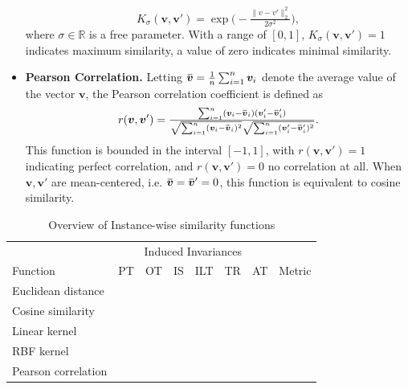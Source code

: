 \documentclass{article}
\newcommand{\Real}{\mathbb{R}}
\newcommand{\ols}[1]{\mskip.5\thinmuskip\overline{\mskip-.5\thinmuskip {#1} \mskip-.5\thinmuskip}\mskip.5\thinmuskip}
\newcommand{\cmark}{\ding{51}}
\newcommand{\xmark}{\ding{55}} %
\begin{document}
\begin{refsegment}
\begin{itemize}
\begin{equation}
        K_\sigma(\bm{v}, \bm{v}') = \exp\Big(-\tfrac{\|v - v'\|^2_2}{2\sigma^2} \Big),
    \end{equation}
    where $\sigma\in\Real$ is a free parameter.
    With a range of $[0, 1]$, $K_\sigma(\bm{v}, \bm{v}') = 1$ indicates maximum similarity, a value of zero indicates minimal similarity.
    \item \textbf{Pearson Correlation.} Letting $\ols{\bm{v}}=\frac{1}{n}\sum_{i=1}^n \bm{v}_i$ denote the average value of the vector $\bm{v}$, the Pearson correlation coefficient is defined as
    \begin{equation}\label{eq:pearson}
        r(\bm{v}, \bm{v}') =
        \tfrac{\sum_{i=1}^n (\bm{v}_i - \ols{\bm{v}}_i)(\bm{v}'_i - \ols{\bm{v}}_i')}
        {\sqrt{\sum_{i=1}^n (\bm{v}_i - \ols{\bm{v}}_i)^2}\sqrt{\sum_{i=1}^n (\bm{v}'_i - \ols{\bm{v}}_i')^2}}.
    \end{equation}
    This function is bounded in the interval $[-1,1]$, with $r(\bm{v}, \bm{v}') = 1$ indicating perfect correlation, and $r(\bm{v}, \bm{v}') = 0$ no correlation at all.
    When $\bm{v},\bm{v}'$ are mean-centered, i.e. $\ols{\bm{v}}=\ols{\bm{v}}'=0$, this function is equivalent to cosine similarity.
\end{itemize}

\begin{table}[t]
\centering

\caption{Overview of Instance-wise similarity functions}\label{tab:simfct}
\begin{tabular}{lccccccc}
\bottomrule  &\multicolumn{6}{c}{\cellcolor{white}Induced Invariances} & \\
\cline{2-7}
Function & PT 			& OT &\cellcolor{white} IS 			& ILT 			& TR 			& AT & Metric \\
\bottomrule
Euclidean distance & \cmark 			& \cmark & \xmark & \xmark & \cmark 			& \xmark & \cmark \\
Cosine similarity & \cmark & \cmark & \cmark & \xmark & \xmark & \xmark & \xmark \\
Linear kernel & \cmark & \cmark & \xmark & \xmark & \xmark & \xmark & \xmark \\
RBF kernel & \cmark 			& \cmark & \xmark & \xmark & \cmark 			& \xmark & \xmark \\
Pearson correlation & \cmark & \cmark & \cmark & \xmark & \cmark & \xmark & \xmark \\\toprule
\end{tabular}
\end{table}




\end{refsegment}
\end{document}
